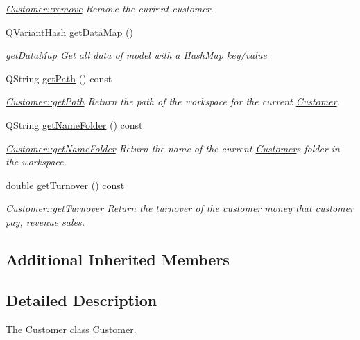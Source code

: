 \begin{DoxyCompactItemize}
\begin{DoxyCompactList}\small\item\em \hyperlink{classModels_1_1Customer_a0f5dba0d90af0adf5d0aca26195d21b1}{Customer\+::remove} Remove the current customer. \end{DoxyCompactList}\item 
Q\+Variant\+Hash \hyperlink{classModels_1_1Customer_ae72b05319056dc482f3f525ef40b8d40}{get\+Data\+Map} ()
\begin{DoxyCompactList}\small\item\em get\+Data\+Map Get all data of model with a Hash\+Map key/value \end{DoxyCompactList}\item 
Q\+String \hyperlink{classModels_1_1Customer_ac1aec0fb9058333e1a2496b1c29049af}{get\+Path} () const 
\begin{DoxyCompactList}\small\item\em \hyperlink{classModels_1_1Customer_ac1aec0fb9058333e1a2496b1c29049af}{Customer\+::get\+Path} Return the path of the workspace for the current \hyperlink{classModels_1_1Customer}{Customer}. \end{DoxyCompactList}\item 
Q\+String \hyperlink{classModels_1_1Customer_ab7c63946125a6b8d876f0f4e2b50c97e}{get\+Name\+Folder} () const 
\begin{DoxyCompactList}\small\item\em \hyperlink{classModels_1_1Customer_ab7c63946125a6b8d876f0f4e2b50c97e}{Customer\+::get\+Name\+Folder} Return the name of the current \hyperlink{classModels_1_1Customer}{Customer}\textquotesingle{}s folder in the workspace. \end{DoxyCompactList}\item 
double \hyperlink{classModels_1_1Customer_a193fb1920b53048d8a5f7c8e08581e69}{get\+Turnover} () const 
\begin{DoxyCompactList}\small\item\em \hyperlink{classModels_1_1Customer_a193fb1920b53048d8a5f7c8e08581e69}{Customer\+::get\+Turnover} Return the turnover of the customer money that customer pay, revenue sales. \end{DoxyCompactList}\end{DoxyCompactItemize}
\subsection*{Additional Inherited Members}


\subsection{Detailed Description}
The \hyperlink{classModels_1_1Customer}{Customer} class \hyperlink{classModels_1_1Customer}{Customer}. 

